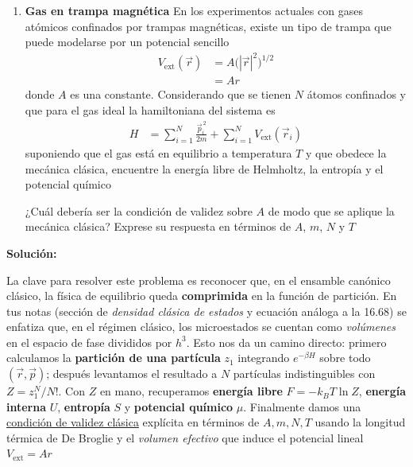\documentclass{article}
\newenvironment{AGbox}[1][7]%
{%
  \begin{tcolorbox}[
    enhanced, breakable,
    colframe=AppleGreen,
    colback=AppleGreen!#1,
    boxrule=1pt,
    borderline west={2mm}{-10mm}{AppleGreen},
    sharp corners=southwest,
    left=14pt,right=14pt,top=10pt,bottom=10pt,
     boxsep=6pt,
  ]%
}{%
  \end{tcolorbox}%
}
\begin{document}
\begin{AGbox}[8]
	\begin{enumerate}[label={{\textcolor{trueblue}{\textbf{Pr.} \arabic*.1}}}, start=1]
		\item \textbf{Gas en trampa magnética}  
		En los experimentos actuales con gases atómicos confinados por trampas magnéticas, existe un tipo de trampa que puede modelarse por un potencial sencillo
		\begin{equation}
			\begin{split}
				V_{\text{ext}}(\vec r)
				&= A\big(|\vec r|^{2}\big)^{1/2} \\
				&= A r
			\end{split}\label{eq:Vext_trampa_lineal}
		\end{equation}
		donde $A$ es una constante. Considerando que se tienen $N$ átomos confinados y que para el gas ideal la hamiltoniana del sistema es
		\begin{equation}
			\begin{split}
				H
				&= \sum_{i=1}^{N} \frac{\vec{p}_i^{\,2}}{2m}
				+ \sum_{i=1}^{N} V_{\text{ext}}(\vec{r}_i)
			\end{split}\label{eq:H_ideal_trampa}
		\end{equation}
		suponiendo que el gas está en equilibrio a temperatura $T$ y que obedece la mecánica clásica, encuentre la energía libre de Helmholtz, la entropía y el potencial químico
		
		¿Cuál debería ser la condición de validez sobre $A$ de modo que se aplique la mecánica clásica?  
		Exprese su respuesta en términos de $A$, $m$, $N$ y $T$
	\end{enumerate}
\end{AGbox}


\textcolor{Cinnabar}{\textbf{Solución:}}


La clave para resolver este problema es reconocer que, en el ensamble canónico clásico, la física de equilibrio queda \textbf{comprimida} en la función de partición. En tus notas (sección de \textit{densidad clásica de estados} y ecuación análoga a la 16.68) se enfatiza que, en el régimen clásico, los microestados se cuentan como \textit{volúmenes} en el espacio de fase divididos por $h^3$. Esto nos da un camino directo: primero calculamos la \textbf{partición de una partícula} $z_1$ integrando $e^{-\beta H}$ sobre todo $(\vec r,\vec p)$; después levantamos el resultado a $N$ partículas indistinguibles con $Z=z_1^N/N!$. Con $Z$ en mano, recuperamos \textbf{energía libre} $F=-k_B T\ln Z$, \textbf{energía interna} $U$, \textbf{entropía} $S$ y \textbf{potencial químico} $\mu$. Finalmente damos una \underline{condición de validez clásica} explícita en términos de $A,m,N,T$ usando la longitud térmica de De Broglie y el \textit{volumen efectivo} que induce el potencial lineal $V_{\text{ext}}=Ar$
\end{document}
